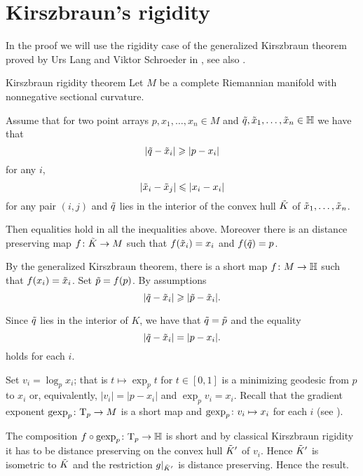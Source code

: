 \section{Kirszbraun's rigidity}

In the proof we will use the rigidity case of the generalized Kirszbraun theorem proved by Urs Lang and Viktor Schroeder in \cite{LS}, see also \cite{AKP}.

\begin{thm}{Kirszbraun rigidity theorem}\label{thm:kirszbraun-rigid}
Let $M$ be a complete Riemannian manifold with nonnegative sectional curvature.

Assume that for two point arrays $p,x_1,\dots,x_n\in M$ and $\~q, \~x_1,\dots,\~x_n\in \HH$ we have that 
\[|\~q-\~x_i|\ge |p-x_i|\]
for any $i$,
\[|\~x_i-\~x_j|\le |x_i-x_i|\]
for any pair $(i,j)$
and $\~q$ lies in the interior of the convex hull $\~K$ of $\~x_1,\dots,\~x_n$.

Then equalities hold in all the inequalities above.
Moreover there is an distance preserving map $f\:\~K\to M$ such that $f(\~x_i)=x_i$ and $f(\~q)=p$. 
\end{thm}

By the generalized Kirszbraun theorem, there is a short map $f\:M\to \HH$
such that $f(x_i)=\~x_i$.
Set  $\~p=f(p)$.
By assumptions
\[|\~q-\~x_i|\ge |\~p-\~x_i|.\]

Since $\~q$ lies in the interior of $K$, we have that $\~q=\~p$ and the equality 
\[|\~q-\~x_i|= |p-x_i|.\]
holds for each $i$.

Set $v_i=\log_px_i$; that is $t\mapsto \exp_pt$ for $t\in[0,1]$ is a minimizing geodesic from $p$ to $x_i$ or, equivalently, $|v_i|=|p-x_i|$ and $\exp_pv_i=x_i$.
Recall that the gradient exponent $\gexp_p\:\T_p\to M$
is a short map and $\gexp_p\:v_i\mapsto x_i$ for each $i$ (see \cite{AKP}).


The composition $f\circ \gexp_p\:\T_p\to \HH$ is short
and by classical Kirszbraun rigidity it has to be distance preserving on the convex hull $\~K'$ of $v_i$.
Hence $\~K'$ is isometric to $\~K$ and the restriction $g|_{\~K'}$ is distance preserving. 
Hence the result.
\qeds
